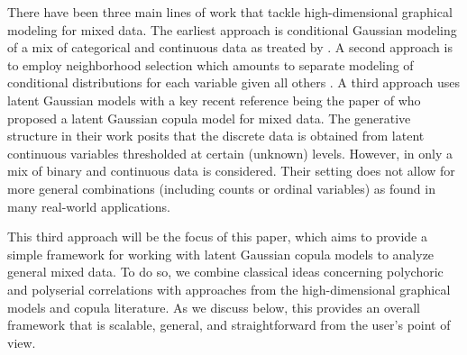 There have been three main lines of work that tackle high-dimensional graphical modeling for mixed data. The earliest approach is conditional Gaussian modeling of a mix of categorical and continuous data \citep{Lauritzen96} as treated by \citet{Cheng17, Lee15}. A second approach is to employ neighborhood selection which amounts to separate modeling of conditional distributions for each variable given all others \citep[see e.g.][]{Chen15, Yang14, Yang19}. A third approach uses latent Gaussian models with a key recent reference being the paper of \citet{Fan17} who proposed a latent Gaussian copula model for mixed data. The generative structure in their work posits that the discrete data is obtained from latent continuous variables thresholded at certain (unknown) levels.  However, in \citet{Fan17} only a mix of binary and continuous data is considered. Their setting does not allow for more general combinations (including counts or ordinal variables) as found in many real-world applications.


This third approach will be the focus of this paper, which aims to provide a simple framework for working with latent Gaussian copula models to analyze general mixed data.
To do so, we combine classical ideas concerning polychoric and polyserial correlations with approaches from the high-dimensional graphical models and copula literature. As we discuss below, this provides an overall framework that is scalable, general, and straightforward from the user's point of view.

